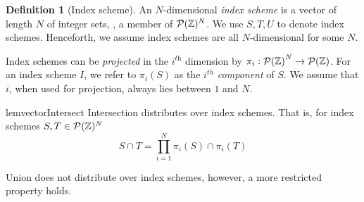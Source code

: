 \documentclass[acmlarge,review,anonymous]{acmart}\settopmatter{printfolios=true}
\theoremstyle{definition}
\newtheorem{defn}{Definition}
\theoremstyle{plain}
\theoremstyle{remark}
\begin{document}
\begin{defn}[Index scheme]
  An $N$-dimensional \emph{index scheme} is a vector of length $N$ of
  integer sets, \ie{}, a member of $\mathcal{P}(\textnormal{$\mathbb{Z}$})^{N}$.
  We use $S, T, U$ to denote index schemes. Henceforth, we assume index schemes
  are all $N$-dimensional for some $N$.

  Index schemes can be \emph{projected} in the $i^{\textit{th}}$ dimension by
  $\pi_i : {\mathcal{P}(\textnormal{$\mathbb{Z}$}{})}^N \to \mathcal{P}(\textnormal{$\mathbb{Z}$}{})$. For an index scheme
  $I$, we refer to $\pi_i(S)$ as the \emph{$i^{th}$ component} of $S$. We assume
  that $i$, when used for projection, always lies between $1$ and $N$.
\end{defn}


\begin{restatable}{lem}{vectorIntersect}
\label{lem:vector-intersect}
  Intersection distributes over index schemes. That is, for index schemes $S, T
  \in \mathcal{P}(\textnormal{$\mathbb{Z}$})^N$
%
  \begin{equation*}
    S \cap T = \prod_{i = 1}^{N} \pi_i(S) \cap \pi_i(T)
  \end{equation*}
\end{restatable}

Union does not distribute over index schemes, however, a more restricted
property holds.
\end{document}
